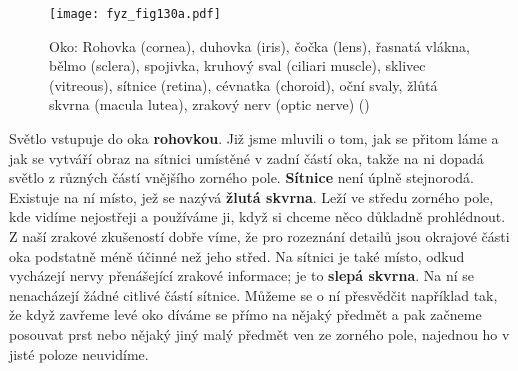     \begin{figure}[ht!]  %
      \centering
      \texttt{[image: fyz\_fig130a.pdf]}
      \caption{Oko: Rohovka (cornea), duhovka (iris), čočka (lens), řasnatá vlákna, bělmo 
              (sclera), spojivka, kruhový sval (ciliari muscle), sklivec (vitreous), sítnice 
              (retina), cévnatka (choroid), oční svaly, žlůtá skvrna (macula lutea), zrakový 
              nerv (optic nerve) 
              (\cite[s.~468]{Feynman01})}
      \label{fyz:fig130a}
    \end{figure} 

    Světlo vstupuje do oka \textbf{rohovkou}. Již jsme mluvili o tom, jak se přitom láme a jak se 
    vytváří obraz na sítnici umístěné v zadní částí oka, takže na ni dopadá světlo z různých částí 
    vnějšího zorného pole. \textbf{Sítnice} není úplně stejnorodá. Existuje na ní místo, jež se 
    nazývá \textbf{žlutá skvrna}. Leží ve středu zorného pole, kde vidíme nejostřeji a používáme 
    ji, když si chceme něco důkladně prohlédnout. Z naší zrakové zkušeností dobře víme, že pro 
    rozeznání detailů jsou okrajové části oka podstatně méně účinné než jeho střed. Na sítnici je 
    také místo, odkud vycházejí nervy přenášející zrakové informace; je to \textbf{slepá skvrna}. 
    Na ní se nenacházejí žádné citlivé částí sítnice. Můžeme se o ní přesvědčit například tak, že 
    když zavřeme levé oko díváme se přímo na nějaký předmět a pak začneme posouvat prst nebo nějaký 
    jiný malý předmět ven ze zorného pole, najednou ho v jisté poloze neuvidíme. 
    
